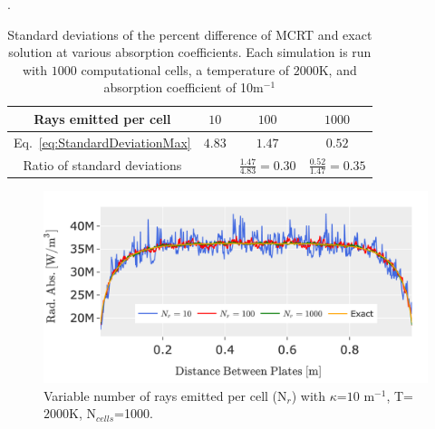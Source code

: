 \begin{table}
\centering
\caption{Standard deviations of the percent difference of MCRT and exact solution at various absorption coefficients. Each simulation is run with $1000$ computational cells, a temperature of $2000$K, and absorption coefficient of 10m$^{-1}$}.
\begin{tabular}{c c c c} 
 \hline
 Rays emitted per cell & $10$ & $100$ & $1000$ \\ [0.5ex] 
 \hline
 Eq.~\ref{eq:StandardDeviationMax} & $4.83$ & $1.47$ & $0.52$ \\
 Ratio of standard deviations & ~ & $\frac{1.47}{4.83}=0.30$ & $\frac{0.52}{1.47}=0.35$ \\
 \hline
\end{tabular}
\label{table:PPcomp_rayct}
\end{table}
\begin{figure}
\centering
\includegraphics[width=0.95\linewidth]{figures/ch4/PPcomparison3.png}
\caption{Variable number of rays emitted per cell (N$_r$) with $\kappa{}$=$10$ m$^{-1}$, T=$2000$K, N$_{cells}$=1000.}
\label{fig:PPcom_nrays}
\end{figure}











